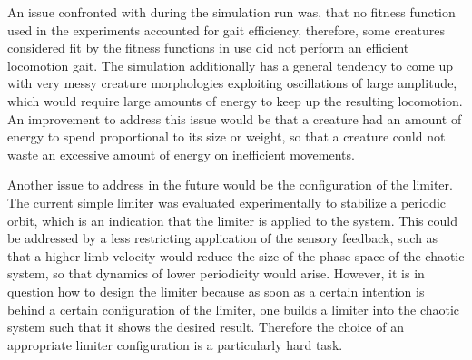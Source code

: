 \documentclass[main]{subfiles}
\begin{document}
An issue confronted with during the simulation run was, that no fitness function used in the experiments accounted for gait efficiency, therefore, some creatures considered fit by the fitness functions in use did not perform an efficient locomotion gait. %
%
The simulation additionally has a general tendency to come up with very messy creature morphologies exploiting oscillations of large amplitude, which would require large amounts of energy to keep up the resulting locomotion. %
%
An improvement to address this issue would be that a creature had an amount of energy to spend proportional to its size or weight, so that a creature could not waste an excessive amount of energy on inefficient movements. 

Another issue to address in the future would be the configuration of the limiter. %
%
The current simple limiter was evaluated experimentally to stabilize a periodic orbit, which is an indication that the limiter is applied to the system. %
%
This could be addressed by a less restricting application of the sensory feedback, such as that a higher limb velocity would reduce the size of the phase space of the chaotic system, so that dynamics of lower periodicity would arise. %
%
However, it is in question how to design the limiter because as soon as a certain intention is behind a certain configuration of the limiter, one builds a limiter into the chaotic system such that it shows the desired result. %
%
Therefore the choice of an appropriate limiter configuration is a particularly hard task.%
\end{document}
